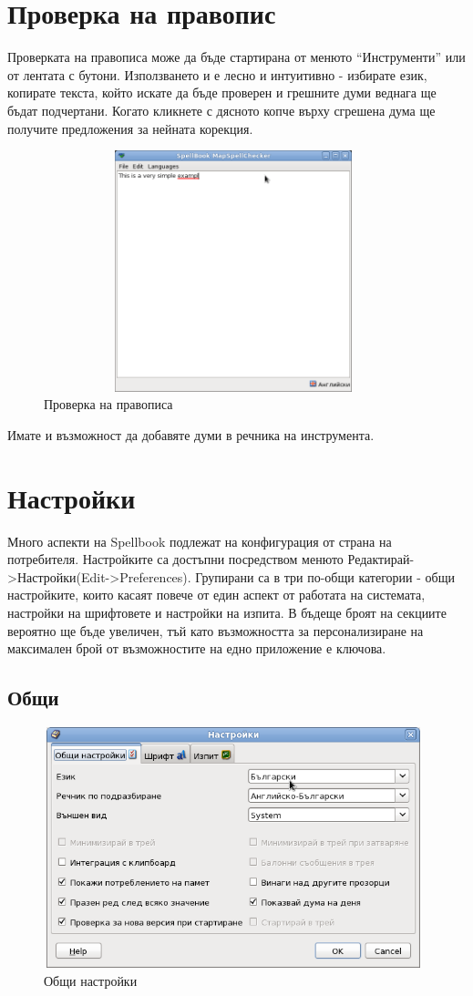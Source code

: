 \section{Проверка на правопис}
Проверката на правописа може да бъде стартирана от менюто
"`Инструменти"' или от лентата с бутони. Използването и е лесно и
интуитивно - избирате език, копирате текста, който искате да бъде
проверен и грешните думи веднага ще бъдат подчертани. Когато кликнете
с дясното копче върху сгрешена дума ще получите предложения за нейната
корекция. 

\begin{figure}[htbp]
  \caption{Проверка на правописа}
  \centering
  \includegraphics[width=110mm, height=70mm]{images/spellcheck_frame.png}
\end{figure}

Имате и възможност да добавяте думи в речника на инструмента.
\section{Настройки}
Много аспекти на Spellbook подлежат на конфигурация от страна на
потребителя. Настройките са достъпни посредством менюто
Редактирай->Настройки(Edit->Preferences). Групирани са в три по-общи
категории - общи настройките, които касаят повече от един аспект от
работата на системата, настройки на шрифтовете и настройки на
изпита. В бъдеще броят на секциите вероятно ще бъде увеличен, тъй като
възможността за персонализиране на максимален брой от възможностите на
едно приложение е ключова.
\subsection{Общи}
\begin{figure}[htbp]
  \caption{Общи настройки}
  \centering
  \includegraphics[width=110mm, height=70mm]{images/general_preferences.png}
\end{figure}

